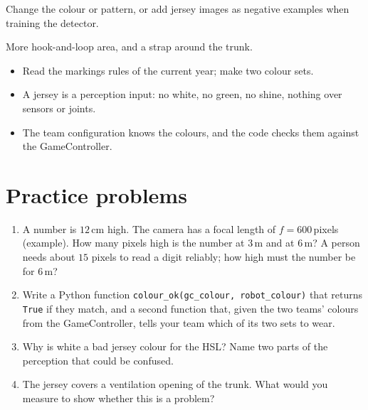 \begin{troublebox}
\begin{description}[leftmargin=0.6cm,nosep]
  \item[The ball detector fires on jerseys] Change the colour or pattern, or add jersey images as negative examples when training the detector.
  \item[The jersey slides during a get-up] More hook-and-loop area, and a strap around the trunk.
\end{description}
\end{troublebox}

\begin{keyidea}
\begin{itemize}[nosep]
  \item Read the markings rules of the current year; make two colour sets.
  \item A jersey is a perception input: no white, no green, no shine, nothing over sensors or joints.
  \item The team configuration knows the colours, and the code checks them against the GameController.
\end{itemize}
\end{keyidea}

\section*{Practice problems}
\begin{enumerate}[label=\textbf{\thechapter.\arabic*}]
  \item A number is $12$\,cm high. The camera has a focal length of $f=600$\,pixels (example). How many pixels high is the number at $3$\,m and at $6$\,m? A person needs about $15$ pixels to read a digit reliably; how high must the number be for $6$\,m?
  \item Write a Python function \verb!colour_ok(gc_colour, robot_colour)! that returns \texttt{True} if they match, and a second function that, given the two teams' colours from the GameController, tells your team which of its two sets to wear.
  \item Why is white a bad jersey colour for the HSL? Name two parts of the perception that could be confused.
  \item The jersey covers a ventilation opening of the trunk. What would you measure to show whether this is a problem?
\end{enumerate}
